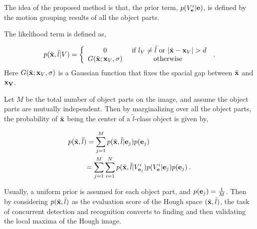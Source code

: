 \documentclass[10pt,twocolumn,letterpaper]{article}
\begin{document}
The idea of the proposed method is that, the prior term, $p({V_{\bf{e}}^i}|{\bf{e}})$, is defined by the motion grouping results of all the object parts.

The likelihood term is defined as,

\begin{equation}
p(\tilde{\bf{x}},\tilde l|V)
= \left\{ \begin{array}{*{20}{c}}
   0   &\mbox{  if } {l_V} \ne \tilde{l} \mbox{ or } |\tilde{\bf{x}} - {\bf{x}}_V| > d   \\
   G(\tilde{\bf{x}};{{\bf{x}}_V},\sigma) &\mbox{otherwise}
\end{array} \right. \:.
\label{eq2}
\end{equation}
Here $G(\tilde{\bf{x}};{\bf{x}}_V,\sigma )$ is a Gaussian function that fixes the spacial gap between $\tilde{\bf{x}}$ and ${\bf{x}_V}$.

Let $M$ be the total number of object parts on the image, and assume the object parts are mutually independent.  Then by marginalizing over all the object parts, the probability of $\tilde{\bf{x}}$ being the center of a $\tilde{l}$-class object is given by,

\begin{equation}
\begin{aligned}
p({\tilde{\bf{x}}},\tilde{l}) &=\sum\limits^M_{j=1} p({\tilde{\bf{x}}},\tilde{l}|{\bf{e}}_j)p({\bf{e}}_j) \\
&{
\begin{aligned}
=\sum\limits^M_{j=1} \sum\limits^N_{i=1} {p({\tilde{\bf{x}}},{\tilde{l}}|{V_{{\bf{e}}_j}^i}) p({V_{\bf{e}}^i}|{\bf{e}}_j)p({\bf{e}}_j)} \:.
\end{aligned}
}
\end{aligned}
\label{eq3}
\end{equation}

Usually, a uniform prior is assumed for each object part, and $p({\bf{e}}_j)=\frac 1 M$. Then by considering $p({\tilde{\bf{x}}},\tilde{l})$ as the evaluation score of the Hough space $({\tilde{\bf{x}}},\tilde{l})$, the task of concurrent detection and recognition converts to finding and then validating the local maxima of the Hough image.
\end{document}

